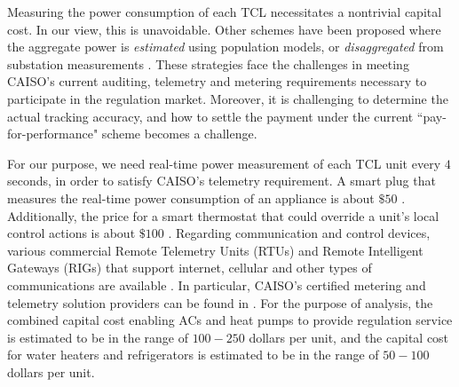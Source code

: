 \documentclass[onecolumn,journal]{IEEEtran}
\begin{document}
Measuring the power consumption of each \ac{TCL} necessitates a nontrivial capital cost. In our view, this is unavoidable. Other schemes have been proposed where the aggregate power is {\em estimated} using population models, or {\em disaggregated} from substation measurements \cite{callaway2009tapping, mathieu2013state}. These strategies face the challenges in meeting CAISO's current auditing, telemetry and metering requirements necessary to participate in the regulation market. Moreover,  it is challenging to determine the actual tracking accuracy, and how to settle the payment under the current ``pay-for-performance" scheme becomes a challenge.

For our purpose, we need real-time power measurement of each \ac{TCL} unit every $4$ seconds, in order to satisfy \ac{CAISO}'s telemetry requirement. A smart plug that measures the real-time power consumption of an appliance is about $\$50$ \cite{smart_plug}. Additionally, the price for a smart thermostat that could override a unit's local control actions is about $\$100$ \cite{smart_thermostat}. Regarding communication and control devices, various commercial Remote Telemetry Units (RTUs) and Remote Intelligent Gateways (RIGs) that support internet, cellular and other types of communications are available \cite{kiliccote2010open,brooks2002vehicle,alcoa}. In particular, CAISO's certified metering and telemetry solution providers can be found in \cite{metering_telemetry}. For the purpose of analysis, the combined capital cost enabling ACs and heat pumps to provide regulation service is estimated to be in the range of $100-250$ dollars per unit, and the capital cost for water heaters and refrigerators is estimated to be in the range of $50-100$ dollars per unit. 
\end{document}
